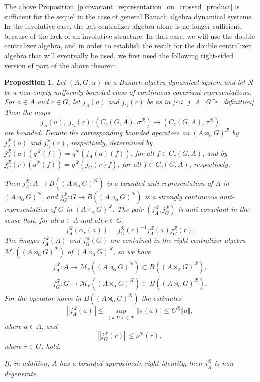 \documentclass{amsart}
\theoremstyle{plain}
\newtheorem{prop}[theorem]{Proposition}
\theoremstyle{definition}
\numberwithin{equation}{section}
\begin{document}
The above Proposition~\ref{p:covariant_representation_on_crossed_product} is sufficient for the sequel in the case of general Banach algebra dynamical systems. In the involutive case, the left centralizer algebra alone is no longer sufficient, because of the lack of an involutive structure. In that case, we will use the double centralizer algebra, and in order to establish the result for the double centralizer algebra that will eventually be used, we first need the following right-sided version of part of the above theorem.

\begin{prop}\label{p:non_degenerate_anti_covariant_anti_representation_on_crossed_product}
Let ${(A,G,\alpha)}$ be a Banach algebra dynamical system and let ${\mathcal R}$ be a non-empty uniformly bounded class of continuous covariant representations. For $a \in A$ and $r \in G$, let $j_A(a)$ and $j_G(r)$ be as in \eqref{e:i_j_A_G^r_definition}. Then the maps
\[ j_A(a), \; j_G(r): (C_c(G,A), {\sigma^{\mathcal R}}) \to (C_c(G,A), {\sigma^{\mathcal R}}) \]
are bounded. Denote the corresponding bounded operators on ${(A {\rtimes}_\alpha G)^\mathcal{R}}$ by $j_A^{\mathcal R}(a)$ and $j_G^{\mathcal R}(r)$, respectively, determined by $j_A^{\mathcal R}(a)({q^{\mathcal R}}(f))={q^{\mathcal R}}(j_A(a)(f))$, for all $f\in C_c(G,A)$, and by $j_G^{\mathcal R}(r)({q^{\mathcal R}}(f))={q^{\mathcal R}}(j_G(r)f)$, for all $f\in C_c(G,A)$, respectively.

Then $j_A^{\mathcal R}: A \to B({(A {\rtimes}_\alpha G)^\mathcal{R}})$ is a bounded anti-representation of $A$ in ${(A {\rtimes}_\alpha G)^\mathcal{R}}$, and $j_G^{\mathcal R}: G\to B({(A {\rtimes}_\alpha G)^\mathcal{R}})$ is a strongly continuous anti-representation of $G$ in ${(A {\rtimes}_\alpha G)^\mathcal{R}}$.
The pair $(j_A^{\mathcal R}, j_G^{\mathcal R})$ is anti-covariant in the sense that, for all $a \in A$ and all $r \in G$,
\[
j_A^{\mathcal R}(\alpha_r(a)) = j_G^{\mathcal R}(r)^{-1} j_A^{\mathcal R}(a) j_G^{\mathcal R}(r).
\]
The images $j_A^{\mathcal R}(A)$ and $j_G^{\mathcal R}(G)$ are contained in the right centralizer algebra $\mathcal M_r({(A {\rtimes}_\alpha G)^\mathcal{R}})$ of ${(A {\rtimes}_\alpha G)^\mathcal{R}}$, so we have
\begin{align*}
 j_A^{\mathcal R}: A \to \mathcal M_r({(A {\rtimes}_\alpha G)^\mathcal{R}}) \subset B({(A {\rtimes}_\alpha G)^\mathcal{R}}), \\
 j_G^{\mathcal R}: G \to \mathcal M_r({(A {\rtimes}_\alpha G)^\mathcal{R}}) \subset B({(A {\rtimes}_\alpha G)^\mathcal{R}}).
\end{align*}
 For the operator norm in $B({(A {\rtimes}_\alpha G)^\mathcal{R}})$ the estimates
\[ {\left\Vert {j_A^{\mathcal R}(a)} \right\Vert} \leq \sup_{{(\pi,U)} \in {\mathcal R}} {\left\Vert {\pi(a)} \right\Vert} \leq {{C^{\mathcal R}}}{\left\Vert {a} \right\Vert}, \]
where $a\in A$, and
\[{\left\Vert {j_G^{\mathcal R}(r)} \right\Vert} \leq {\nu^{\mathcal R}}(r),\]
where $r\in G$, hold.

If, in addition, $A$ has a bounded approximate right identity, then $j_A^{\mathcal R}$ is non-degenerate.
\end{prop}
\end{document}
